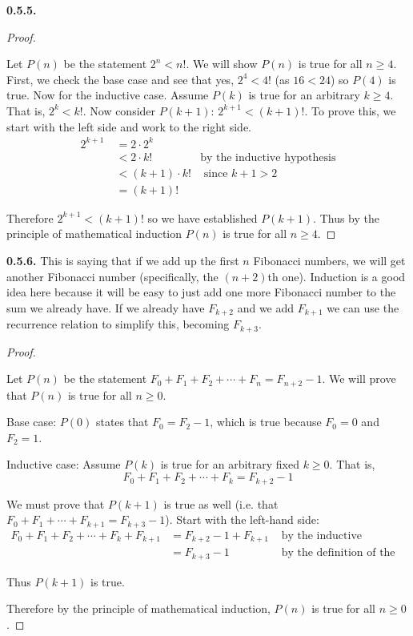 \documentclass[12pt,]{book}
\theoremstyle{plain}
\theoremstyle{definition}
\theoremstyle{definition}
\theoremstyle{definition}
\numberwithin{equation}{chapter}
\newcommand{\lt}{<}
\newcommand{\gt}{>}
\newcommand{\amp}{&}
\begin{document}
\noindent\textbf{0.5.5.} \begin{proof}\hypertarget{proof-9}{}
\hypertarget{p-441}{}%
Let \(P(n)\) be the statement \(2^n \lt  n!\). We will show \(P(n)\) is true for all \(n \ge 4\). First, we check the base case and see that yes, \(2^4 \lt  4!\) (as \(16 \lt  24\)) so \(P(4)\) is true. Now for the inductive case. Assume \(P(k)\) is true for an arbitrary \(k \ge 4\). That is, \(2^k \lt  k!\). Now consider \(P(k+1)\): \(2^{k+1} \lt  (k+1)!\). To prove this, we start with the left side and work to the right side.%
\begin{align*}
2^{k+1}~ \amp = 2\cdot 2^k \amp\\
\amp \lt 2\cdot k! \amp \text{by the inductive hypothesis}\\
\amp \lt (k+1) \cdot k! \amp \text{ since } k+1 \gt 2\\
\amp = (k+1)! \amp
\end{align*}
%
\par
\hypertarget{p-442}{}%
Therefore \(2^{k+1} \lt  (k+1)!\) so we have established \(P(k+1)\). Thus by the principle of mathematical induction \(P(n)\) is true for all \(n \ge 4\).%
\end{proof}
\par\smallskip
\noindent\textbf{0.5.6.} \hypertarget{p-444}{}%
This is saying that if we add up the first \(n\) Fibonacci numbers, we will get another Fibonacci number (specifically, the \((n+2)\)th one). Induction is a good idea here because it will be easy to just add one more Fibonacci number to the sum we already have. If we already have \(F_{k+2}\) and we add \(F_{k+1}\) we can use the recurrence relation to simplify this, becoming \(F_{k+3}\).%
\begin{proof}\hypertarget{proof-10}{}
\hypertarget{p-445}{}%
Let \(P(n)\) be the statement \(F_0 + F_1 + F_2 + \cdots + F_n = F_{n+2} - 1\). We will prove that \(P(n)\) is true for all \(n \ge 0\).%
\par
\hypertarget{p-446}{}%
Base case: \(P(0)\) states that \(F_0 = F_2 - 1\), which is true because \(F_0 = 0\) and \(F_2 = 1\).%
\par
\hypertarget{p-447}{}%
Inductive case: Assume \(P(k)\) is true for an arbitrary fixed \(k \ge 0\). That is,%
\begin{equation*}
F_0 + F_1 + F_2 + \cdots + F_k = F_{k+2} - 1
\end{equation*}
%
\par
\hypertarget{p-448}{}%
We must prove that \(P(k+1)\) is true as well (i.e. that \(F_0 + F_1 + \cdots +F_{k+1} = F_{k+3} - 1\)). Start with the left-hand side:%
\begin{align*}
F_0 + F_1 + F_2 + \cdots + F_k + F_{k+1} \amp = F_{k+2} - 1 + F_{k+1} \amp \mbox{ by the inductive hypothesis}\\
\amp = F_{k+3} - 1 \amp \mbox{ by the definition of the Fibonacci numbers}
\end{align*}
%
\par
\hypertarget{p-449}{}%
Thus \(P(k+1)\) is true.%
\par
\hypertarget{p-450}{}%
Therefore by the principle of mathematical induction, \(P(n)\) is true for all \(n \ge 0\).%
\end{proof}
\end{document}
